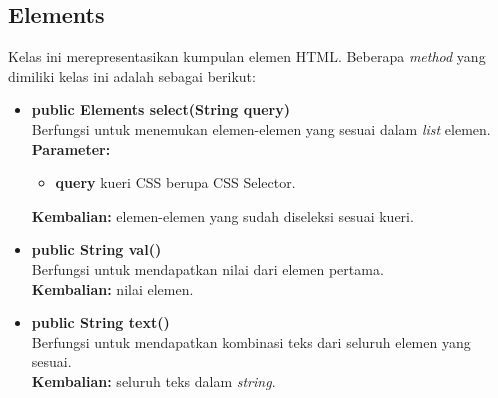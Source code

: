 \subsection{Elements}
Kelas ini merepresentasikan kumpulan elemen HTML. Beberapa \textit{method} yang dimiliki kelas ini adalah sebagai berikut:
\begin{itemize}
	    \item \textbf{public Elements select(String query)} \\
		Berfungsi untuk menemukan elemen-elemen yang sesuai dalam \textit{list} elemen. \\
		\textbf{Parameter:} 
		\begin{itemize}
			\item \textbf{query} kueri CSS berupa CSS Selector.
		\end{itemize}
		\textbf{Kembalian:} elemen-elemen yang sudah diseleksi sesuai kueri.	
		
		\item \textbf{public String val()} \\
		Berfungsi untuk mendapatkan nilai dari elemen pertama. \\
		\textbf{Kembalian:} nilai elemen.	
		
		\item \textbf{public String text()} \\
		Berfungsi untuk mendapatkan kombinasi teks dari seluruh elemen yang sesuai. \\
		\textbf{Kembalian:} seluruh teks dalam \textit{string}.	
\end{itemize}



